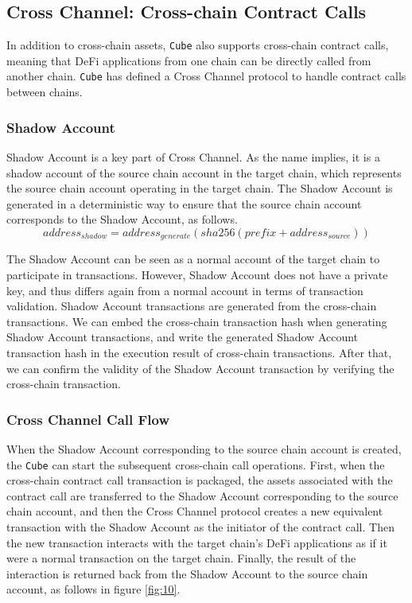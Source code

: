 \documentclass{iacrtrans}
\begin{document}
\subsection{Cross Channel: Cross-chain Contract Calls}
In addition to cross-chain assets, \texttt{Cube} also supports cross-chain contract calls, meaning that DeFi applications from one chain can be directly called from another chain. \texttt{Cube} has defined a Cross Channel protocol to handle contract calls between chains.


\subsubsection{Shadow Account}
Shadow Account is a key part of Cross Channel. As the name implies, it is a shadow account of the source chain account in the target chain, which represents the source chain account operating in the target chain.
The Shadow Account is generated in a deterministic way to ensure that the source chain account corresponds to the Shadow Account, as follows.
$$address_{shadow} = address_{generate}(sha256(prefix + address_{source}))$$

The Shadow Account can be seen as a normal account of the target chain to participate in transactions.
However, Shadow Account does not have a private key, and thus differs again from a normal account in terms of transaction validation. Shadow Account transactions are generated from the cross-chain transactions. We can embed the cross-chain transaction hash when generating Shadow Account transactions, and write the generated Shadow Account transaction hash in the execution result of cross-chain transactions. After that, we can confirm the validity of the Shadow Account transaction by verifying the cross-chain transaction.

\subsubsection{Cross Channel Call Flow}
When the Shadow Account corresponding to the source chain account is created, the \texttt{Cube} can start the subsequent cross-chain call operations. First, when the cross-chain contract call transaction is packaged, the assets associated with the contract call are transferred to the Shadow Account corresponding to the source chain account, and then the Cross Channel protocol creates a new equivalent transaction with the Shadow Account as the initiator of the contract call. Then the new transaction interacts with the target chain's DeFi applications as if it were a normal transaction on the target chain. Finally, the result of the interaction is returned back from the Shadow Account to the source chain account, as follows in figure \ref{fig:10}.
\end{document}
